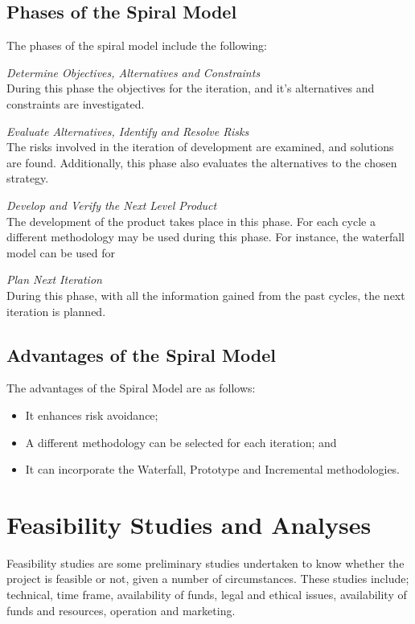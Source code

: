 \subsection{Phases of the Spiral Model}
The phases of the spiral model include the following:

\textit{Determine Objectives, Alternatives and Constraints}\\
During this phase the objectives for the iteration, and it's alternatives and constraints are investigated.

\textit{Evaluate Alternatives, Identify and Resolve Risks}\\
The risks involved in the iteration of development are examined, and solutions are found. Additionally, this phase also evaluates the alternatives to the chosen strategy.

\textit{Develop and Verify the Next Level Product}\\
The development of the product takes place in this phase. For each cycle a different methodology may be used during this phase. For instance, the waterfall model can be used for 

\textit{Plan Next Iteration}\\
During this phase, with all the information gained from the past cycles, the next iteration is planned.

\subsection{Advantages of the Spiral Model}
The advantages of the Spiral Model are as follows:
\begin{itemize}
	\item It enhances risk avoidance;
	\item A different methodology can be selected for each iteration; and 
	\item It can incorporate the Waterfall, Prototype and Incremental methodologies.
\end{itemize}

\section{Feasibility Studies and Analyses}
Feasibility studies are some preliminary studies undertaken to know whether the project is feasible or not, given a number of circumstances. These studies include; technical, time frame, availability of funds, legal and ethical issues, availability of funds and resources, operation and marketing.

